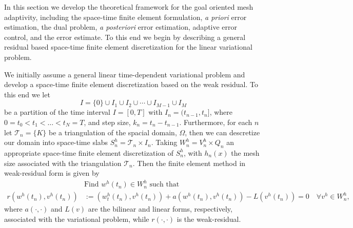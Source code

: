 In this section we develop the theoretical framework for the goal oriented mesh
adaptivity, including the space-time finite element formulation, \emph{a priori}
error estimation, the dual problem, \emph{a posteriori} error estimation,
adaptive error control, and the error estimate. To this end we begin by
describing a general residual based space-time finite element discretization for
the linear variational problem.

We initially assume a general linear time-dependent variational problem and
develop a space-time finite element discretization based on the weak residual.
To this end we let
\begin{equation*}
    I = \{0\} \cup I_1 \cup I_2 \cup \cdots \cup I_{M-1} \cup I_M
\end{equation*}
be a partition of the time interval $I = [0, T]$ with $I_n = (t_{n-1}, t_n]$,
where $0=t_0 < t_1 < \ldots < t_N = T$, and step size, $k_n = t_n - t_{n-1}$.
Furthermore, for each $n$ let $\mathcal{T}_n= \{K\}$ be a triangulation of the
spacial domain, $\Omega$, then we can descretize our domain into space-time
slabs $S_n^h = \mathcal{T}_n \times I_n$. Taking $W_n^h = V_n^h \times Q_n$ an
appropriate space-time finite element discretization of $S_n^h$, with $h_n(x)$
the mesh size associated with the triangulation $\mathcal{T}_n$. Then the finite
element method in weak-residual form is given by
\begin{equation}
    \begin{split}
        &\text{Find } w^h(t_n) \in W^h_n \text{ such that} \\
        r(w^h(t_n), v^h(t_n)) &:= (w^h_t(t_n), v^h(t_n)) + a(w^h(t_n),
            v^h(t_n)) - L(v^h(t_n)) = 0 \quad \forall
            v^h \in W^h_n,
    \end{split}
    \label{eq:WeakResidual}
\end{equation}
where $a(\cdot, \cdot)$ and $L(v)$ are the bilinear and linear forms,
respectively, associated with the variational problem, while $r(\cdot, \cdot)$
is the weak-residual.

